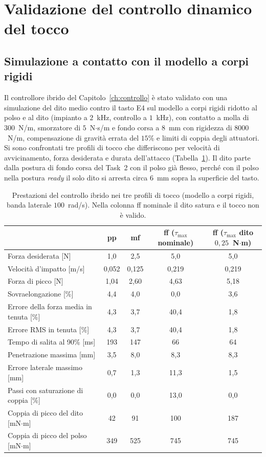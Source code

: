 \section{Validazione del controllo dinamico del tocco}
\label{sec:val_controllo}

\subsection{Simulazione a contatto con il modello a corpi rigidi}

Il controllore ibrido del Capitolo~\ref{ch:controllo} è stato validato con una simulazione del dito medio contro il tasto E4 sul modello a corpi rigidi ridotto al polso e al dito (impianto a $2$~kHz, controllo a $1$~kHz), con contatto a molla di $300$~N/m, smorzatore di $5$~N$\cdot$s/m e fondo corsa a $8$~mm con rigidezza di $8000$~N/m, compensazione di gravità errata del $15\%$ e limiti di coppia degli attuatori. Si sono confrontati tre profili di tocco che differiscono per velocità di avvicinamento, forza desiderata e durata dell'attacco (Tabella~\ref{tab:touch}). Il dito parte dalla postura di fondo corsa del Task~2 con il polso già flesso, perché con il polso nella postura \textit{ready} il solo dito si arresta circa $6$~mm sopra la superficie del tasto.

\begin{table}[htbp]
    \centering
    \renewcommand{\arraystretch}{1.1}
    \footnotesize
    \begin{tabular}{|l|cccc|}
        \hline
        & pp & mf & ff ($\tau_{\max}$ nominale) & ff ($\tau_{\max}$ dito $0{,}25$~N$\cdot$m)\\ \hline \hline
        Forza desiderata [N] & 1,0 & 2,5 & 5,0 & 5,0\\
        Velocità d'impatto [m/s] & 0,052 & 0,125 & 0,219 & 0,219\\
        Forza di picco [N] & 1,04 & 2,60 & 4,63 & 5,18\\
        Sovraelongazione [\%] & 4,4 & 4,0 & 0,0 & 3,6\\
        Errore della forza media in tenuta [\%] & 4,3 & 3,7 & 40,4 & 1,8\\
        Errore RMS in tenuta [\%] & 4,3 & 3,7 & 40,4 & 1,8\\
        Tempo di salita al 90\% [ms] & 193 & 147 & 66 & 64\\
        Penetrazione massima [mm] & 3,5 & 8,0 & 8,3 & 8,3\\
        Errore laterale massimo [mm] & 0,7 & 1,3 & 11,3 & 1,5\\
        Passi con saturazione di coppia [\%] & 0,0 & 0,0 & 13,0 & 0,0\\
        Coppia di picco del dito [mN$\cdot$m] & 42 & 91 & 100 & 187\\
        Coppia di picco del polso [mN$\cdot$m] & 349 & 525 & 745 & 745\\ \hline
    \end{tabular}
    \caption{Prestazioni del controllo ibrido nei tre profili di tocco (modello a corpi rigidi, banda laterale $100$~rad/s). Nella colonna ff nominale il dito satura e il tocco non è valido.}
    \label{tab:touch}
\end{table}

